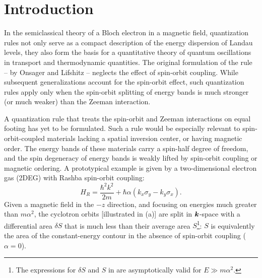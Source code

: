 \documentclass[aps, showpacs, twocolumn, notitlepage, superscriptaddress]{revtex4-1}
\begin{document}
\maketitle

\section{Introduction}
In the semiclassical theory of a Bloch electron in a magnetic field,  quantization rules not  only serve as a compact description of the  energy dispersion of Landau levels, they also form the basis for a quantitative theory of quantum oscillations in transport\cite{SdH} and thermodynamic\cite{dHvA} quantities.  The original formulation of the rule -- by Onsager\cite{Onsager} and Lifshitz\cite{lifshitz_kosevich,lifshitz_kosevich_jetp} -- neglects the effect of spin-orbit coupling. While subsequent generalizations \cite{rotheffham, rothmag, mikitik_manifestation_1999, topoferm, 100p, gao_zero-field_2017, fuchs_landau_2018} account for the spin-orbit effect, such quantization rules apply only when the spin-orbit splitting of energy bands is much stronger (or much weaker) than the Zeeman interaction.

A quantization rule that treats the spin-orbit and Zeeman interactions on equal footing has yet to be formulated. Such a rule would be especially relevant to spin-orbit-coupled materials lacking a spatial inversion center, or having magnetic order. The energy bands of these materials carry a spin-half degree of freedom, and the spin degeneracy of energy bands is weakly lifted by spin-orbit coupling or magnetic ordering. A prototypical example is given by a two-dimensional electron gas (2DEG) with Rashba spin-orbit coupling:
\begin{equation}
H_R=\frac{{\hbar^2} k^2}{2m}+\hbar\alpha  (k_{x}\sigma_{y}-k_{y}\sigma_{x}).\label{eq:Rashba-Hamiltonian}
\end{equation}
Given a magnetic field in the $-z$ direction, and focusing on energies much greater than $m\alpha^2$, the cyclotron orbits [illustrated in (a)]   are split in $\boldsymbol{k}$-space with a differential area  $\delta S$ that is much less than their average area $S$\footnote{The expressions for $\delta S$ and $S$ in  are asymptotically valid for $E{\gg}m\alpha^2$.}:
$S$ is equivalently the area of the constant-energy contour in the absence of spin-orbit coupling ($\alpha{=}0$).
\end{document}
